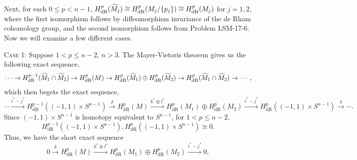 \documentclass{article}
\begin{document}
	Next, for each $0 \leq p < n - 1$, $H^{p}_{\text{dR}}(\widetilde{M}_{j}) \cong H^{p}_{\text{dR}}(M_{j}/\{p_{j}\}) \cong H^{p}_{\text{dR}}(M_{j})$ for $j = 1, 2$, where the first isomorphism follows by diffeomorphism invariance of the de Rham cohomology group, and the second isomorphism follows from Problem LSM-17-6. Now we will examine a few different cases. 
	
	\textsc{Case 1:} Suppose $1 < p \leq n - 2$, $n > 3$. The Mayer-Vietoris theorem gives us the following exact sequence, 
	\begin{equation*}
		\dotsm \to H^{p-1}_{\text{dR}}(\widetilde{M}_{1} \cap \widetilde{M}_{2}) \to H^{p}_{\text{dR}}(M) \to H^{p}_{\text{dR}}(\widetilde{M}_{1}) \oplus H^{p}_{\text{dR}}(\widetilde{M}_{2}) \to H^{p}_{\text{dR}}(\widetilde{M}_{1} \cap \widetilde{M}_{2}) \to \dotsm,
	\end{equation*}
	which then begets the exact sequence,
	\begin{equation*}
		\dotsm \xrightarrow{i^{\ast} - j^{\ast}} H^{p-1}_{\text{dR}}((-1,1) \times S^{n-1}) \xrightarrow{\delta} H^{p}_{\text{dR}}(M) \xrightarrow{k^{\ast}\oplus l^{\ast}} H^{p}_{\text{dR}}(M_{1}) \oplus H^{p}_{\text{dR}}(M_{2}) \xrightarrow{i^{\ast} - j^{\ast}} H^{p}_{\text{dR}}((-1,1) \times S^{n-1}) \xrightarrow{\delta} \dotsm. 
	\end{equation*}
	Since $(-1,1) \times S^{n-1}$ is homotopy equivalent to $S^{n-1}$, for $1 < p \leq n- 2$, 
	\begin{equation*}
		H^{p-1}_{\text{dR}}((-1,1) \times S^{n-1}), H^{p}_{\text{dR}}((-1,1) \times S^{n-1}) \cong 0. 
	\end{equation*}
	Thus, we have the short exact sequence
	\begin{equation*}
		0 \xrightarrow{\delta} H^{p}_{\text{dR}}(M) \xrightarrow{k^{\ast} \oplus l^{\ast}} H^{p}_{\text{dR}}(M_{1}) \oplus H^{p}_{\text{dR}}(M_{2}) \xrightarrow{i^{\ast} - j^{\ast}} 0, 
	\end{equation*}
	
\end{document}
